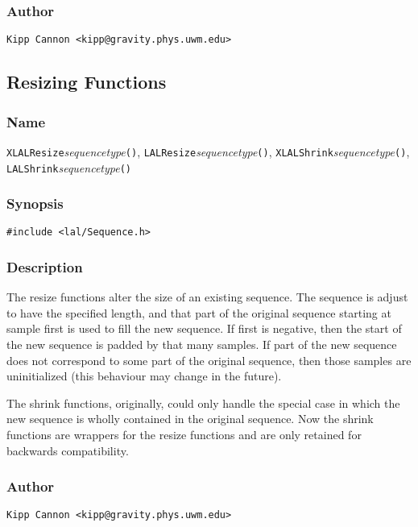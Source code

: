 \subsubsection{Author}

\verb|Kipp Cannon <kipp@gravity.phys.uwm.edu>|


\subsection{Resizing Functions}

\subsubsection{Name}

\texttt{XLALResize}\textit{sequencetype}\texttt{()},
\texttt{LALResize}\textit{sequencetype}\texttt{()},
\texttt{XLALShrink}\textit{sequencetype}\texttt{()},
\texttt{LALShrink}\textit{sequencetype}\texttt{()}

\subsubsection{Synopsis}

\begin{verbatim}
#include <lal/Sequence.h>
\end{verbatim}


\subsubsection{Description}

The resize functions alter the size of an existing sequence.  The sequence
is adjust to have the specified length, and that part of the original
sequence starting at sample first is used to fill the new sequence.  If
first is negative, then the start of the new sequence is padded by that
many samples.  If part of the new sequence does not correspond to some part
of the original sequence, then those samples are uninitialized (this
behaviour may change in the future).

The shrink functions, originally, could only handle the special case in
which the new sequence is wholly contained in the original sequence.  Now
the shrink functions are wrappers for the resize functions and are only
retained for backwards compatibility.

\subsubsection{Author}

\verb|Kipp Cannon <kipp@gravity.phys.uwm.edu>|

